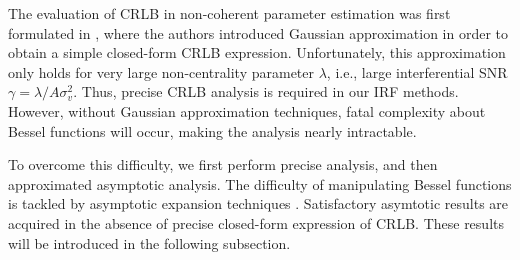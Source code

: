 \documentclass[12pt,draftclsnofoot,journal,onecolumn]{IEEEtran}
\theoremstyle{nonumberplain}
\begin{document}
    The evaluation of CRLB in non-coherent parameter estimation was first formulated in \cite{jiang2016cramer}, where the authors introduced Gaussian approximation in order to obtain a simple closed-form CRLB expression. Unfortunately, this approximation only holds for very large non-centrality parameter $\lambda$, i.e., large interferential SNR $\gamma=\lambda/A\sigma_v^2$. Thus, precise CRLB analysis is required in our \ac{IRF} methods. However, without Gaussian approximation techniques, fatal complexity about Bessel functions will occur, making the analysis nearly intractable. 

    To overcome this difficulty, we first perform precise analysis, and then approximated asymptotic analysis. The difficulty of manipulating Bessel functions is tackled by asymptotic expansion techniques \cite{silverman1972special}. Satisfactory asymtotic results are acquired in the absence of precise closed-form expression of CRLB. These results will be introduced in the following subsection.  
    
\end{document}
